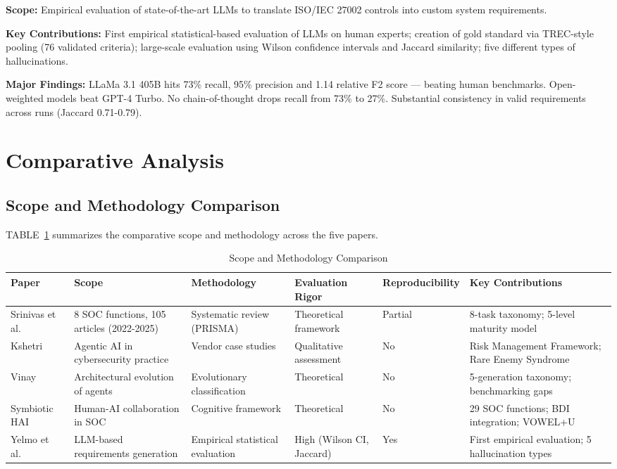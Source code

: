 \documentclass[journal]{IEEEtran}
\begin{document}
\textbf{Scope:} Empirical evaluation of state-of-the-art LLMs to translate ISO/IEC 27002 controls into custom system requirements.

\textbf{Key Contributions:} First empirical statistical-based evaluation of LLMs on human experts; creation of gold standard via TREC-style pooling (76 validated criteria); large-scale evaluation using Wilson confidence intervals and Jaccard similarity; five different types of hallucinations.

\textbf{Major Findings:} LLaMa 3.1 405B hits 73\% recall, 95\% precision and 1.14 relative F2 score --- beating human benchmarks. Open-weighted models beat GPT-4 Turbo. No chain-of-thought drops recall from 73\% to 27\%. Substantial consistency in valid requirements across runs (Jaccard 0.71-0.79).

\section{Comparative Analysis}

\subsection{Scope and Methodology Comparison}
TABLE~\ref{tab:scope} summarizes the comparative scope and methodology across the five papers.

\begin{table}[!t]
\centering
\caption{Scope and Methodology Comparison}
\label{tab:scope}
\begin{tabularx}{\textwidth}{|p{2.5cm}|p{2.5cm}|p{2.5cm}|p{2.5cm}|p{2.5cm}|X|}
\hline
\textbf{Paper} & \textbf{Scope} & \textbf{Methodology} & \textbf{Evaluation Rigor} & \textbf{Reproducibility} & \textbf{Key Contributions} \\
\hline
Srinivas et al.~\cite{srinivas2025} & 8 SOC functions, 105 articles (2022-2025) & Systematic review (PRISMA) & Theoretical framework & Partial & 8-task taxonomy; 5-level maturity model \\
\hline
Kshetri~\cite{kshetri2025} & Agentic AI in cybersecurity practice & Vendor case studies & Qualitative assessment & No & Risk Management Framework; Rare Enemy Syndrome \\
\hline
Vinay~\cite{vinay2025} & Architectural evolution of agents & Evolutionary classification & Theoretical & No & 5-generation taxonomy; benchmarking gaps \\
\hline
Symbiotic HAI~\cite{symbiotic2025} & Human-AI collaboration in SOC & Cognitive framework & Theoretical & No & 29 SOC functions; BDI integration; VOWEL+U \\
\hline
Yelmo et al.~\cite{yelmo2025} & LLM-based requirements generation & Empirical statistical evaluation & High (Wilson CI, Jaccard) & Yes & First empirical evaluation; 5 hallucination types \\
\hline
\end{tabularx}
\end{table}
\end{document}
